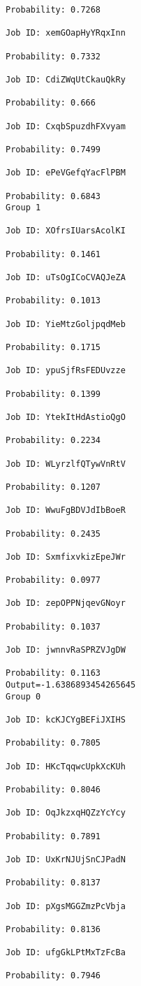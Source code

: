 \documentclass[11pt]{article}
\begin{document}
\begin{Verbatim}[commandchars=\\\{\}]
Probability: 0.7268

Job ID: xemGOapHyYRqxInn

Probability: 0.7332

Job ID: CdiZWqUtCkauQkRy

Probability: 0.666

Job ID: CxqbSpuzdhFXvyam

Probability: 0.7499

Job ID: ePeVGefqYacFlPBM

Probability: 0.6843
Group 1

Job ID: XOfrsIUarsAcolKI

Probability: 0.1461

Job ID: uTsOgICoCVAQJeZA

Probability: 0.1013

Job ID: YieMtzGoljpqdMeb

Probability: 0.1715

Job ID: ypuSjfRsFEDUvzze

Probability: 0.1399

Job ID: YtekItHdAstioQgO

Probability: 0.2234

Job ID: WLyrzlfQTywVnRtV

Probability: 0.1207

Job ID: WwuFgBDVJdIbBoeR

Probability: 0.2435

Job ID: SxmfixvkizEpeJWr

Probability: 0.0977

Job ID: zepOPPNjqevGNoyr

Probability: 0.1037

Job ID: jwnnvRaSPRZVJgDW

Probability: 0.1163
Output=-1.6386893454265645
Group 0

Job ID: kcKJCYgBEFiJXIHS

Probability: 0.7805

Job ID: HKcTqqwcUpkXcKUh

Probability: 0.8046

Job ID: OqJkzxqHQZzYcYcy

Probability: 0.7891

Job ID: UxKrNJUjSnCJPadN

Probability: 0.8137

Job ID: pXgsMGGZmzPcVbja

Probability: 0.8136

Job ID: ufgGkLPtMxTzFcBa

Probability: 0.7946


\end{Verbatim}
\end{document}
